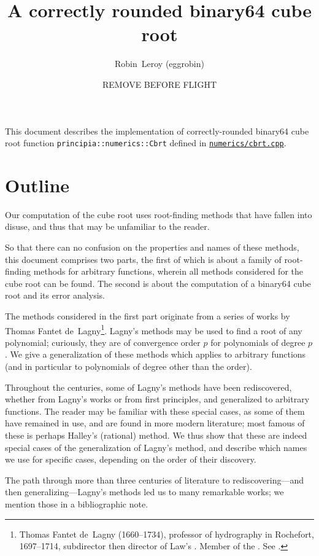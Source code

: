﻿\documentclass[10pt, a4paper, twoside]{basestyle}
\title{A correctly rounded binary64 cube root}
\date{REMOVE BEFORE FLIGHT \printdate{2021-04-36}}
\author{Robin~Leroy (eggrobin)}
\begin{document}
\maketitle
\noindent
This document describes the implementation of correctly-rounded binary64 cube root function {\texttt{principia::numerics::Cbrt}}
defined in \href{https://github.com/mockingbirdnest/Principia/blob/master/numerics/cbrt.cpp}{\texttt{numerics/cbrt.cpp}}.

\part*{Outline}

Our computation of the cube root uses root-finding methods that have fallen into disuse, and thus that may be unfamiliar to the reader.

So that there can no confusion on the properties and names of these methods, this document comprises two parts,
the first of which is about a family of root-finding methods for arbitrary functions, wherein all methods
considered for the cube root can be found. The second is about the computation of a binary64 cube root and its error
analysis.

The methods considered in the first part originate from a series of works by Thomas Fantet de~Lagny\footnote{Thomas Fantet de~Lagny (1660--1734), professor
of hydrography in Rochefort, 1697--1714, subdirector then director of Law's .
Member of the . See \cite{Fontenelle1734}.}. Lagny's methods
may be used to find a root of any polynomial; curiously, they are of convergence order $p$ for polynomials of degree $p$.
We give a generalization of these methods which applies to arbitrary functions (and in particular to polynomials
of degree other than the order).

Throughout the centuries, some of Lagny's methods have been rediscovered, whether from Lagny's works or from first principles,
and generalized to arbitrary functions. The reader may be familiar with these special cases, as some of them have remained in
use, and are found in more modern literature; most famous of these is perhaps Halley's (rational) method. We thus show that
these are indeed special cases of the generalization of Lagny's method, and describe which names we use for specific cases,
depending on the order of their discovery.

The path through more than three centuries of literature to rediscovering---and then generalizing---Lagny's methods led us to
many remarkable works; we mention those in a bibliographic note.
\end{document}

